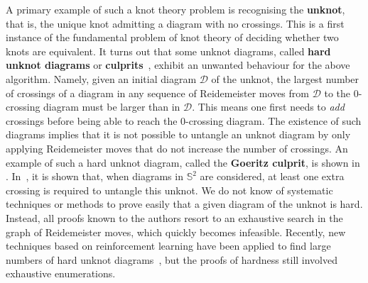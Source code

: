 \documentclass{article}
\begin{document}
A primary example of such a knot theory problem is recognising the \textbf{unknot}, that is, the unique knot admitting a diagram with no crossings. This is a first instance of the fundamental problem of knot theory of deciding whether two knots are equivalent. It turns out that some unknot diagrams, called \textbf{hard unknot diagrams} or \textbf{culprits}~\cite{Mesmay_hard_unknot,Kauffman_untangling}, exhibit an unwanted behaviour for the above algorithm. Namely, given an initial diagram $\mathcal{D}$ of the unknot, the largest number of crossings of a diagram in any sequence of Reidemeister moves from $\mathcal{D}$ to the $0$-crossing diagram must be larger than in $\mathcal{D}$. This means one first needs to \emph{add} crossings before being able to reach the $0$-crossing diagram. The existence of such diagrams implies that it is not possible to untangle an unknot diagram by only applying Reidemeister moves that do not increase the number of crossings. An example of such a hard unknot diagram, called the \textbf{Goeritz culprit}, is shown in . In~\cite{Mesmay_hard_unknot}, it is shown that, when diagrams in $\mathbb{S}^2$ are considered, at least one extra crossing is required to untangle this unknot. We do not know of systematic techniques or methods to prove easily that a given diagram of the unknot is hard. Instead, all proofs known to the authors resort to an exhaustive search in the graph of Reidemeister moves, which quickly becomes infeasible. Recently, new techniques based on reinforcement learning have been applied to find large numbers of hard unknot diagrams~\cite{applebaum2024unknotting}, but the proofs of hardness still involved exhaustive enumerations.
\end{document}
